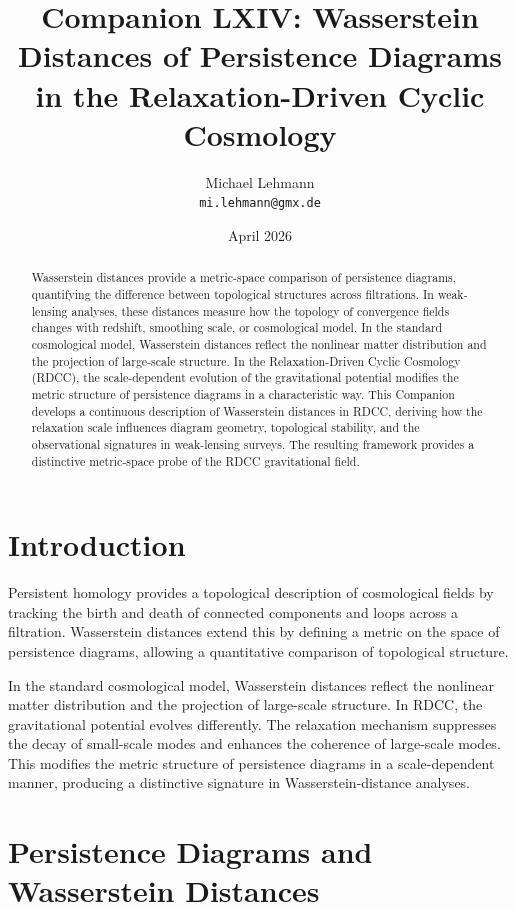 \documentclass[11pt,a4paper]{article}
\title{\textbf{Companion LXIV: Wasserstein Distances of Persistence Diagrams in the Relaxation-Driven Cyclic Cosmology}}
\author{Michael Lehmann \\ \texttt{mi.lehmann@gmx.de}}
\date{April 2026}
\begin{document}
\maketitle

\begin{abstract}
Wasserstein distances provide a metric-space comparison of persistence diagrams, 
quantifying the difference between topological structures across filtrations. In 
weak-lensing analyses, these distances measure how the topology of convergence 
fields changes with redshift, smoothing scale, or cosmological model. In the 
standard cosmological model, Wasserstein distances reflect the nonlinear matter 
distribution and the projection of large-scale structure. In the Relaxation-Driven 
Cyclic Cosmology (RDCC), the scale-dependent evolution of the gravitational 
potential modifies the metric structure of persistence diagrams in a 
characteristic way. This Companion develops a continuous description of 
Wasserstein distances in RDCC, deriving how the relaxation scale influences 
diagram geometry, topological stability, and the observational signatures in 
weak-lensing surveys. The resulting framework provides a distinctive metric-space 
probe of the RDCC gravitational field.
\end{abstract}
\section{Introduction}

Persistent homology provides a topological description of cosmological fields by 
tracking the birth and death of connected components and loops across a 
filtration. Wasserstein distances extend this by defining a metric on the space of 
persistence diagrams, allowing a quantitative comparison of topological structure.

In the standard cosmological model, Wasserstein distances reflect the nonlinear 
matter distribution and the projection of large-scale structure. In RDCC, the 
gravitational potential evolves differently. The relaxation mechanism suppresses 
the decay of small-scale modes and enhances the coherence of large-scale modes. 
This modifies the metric structure of persistence diagrams in a scale-dependent 
manner, producing a distinctive signature in Wasserstein-distance analyses.
\section{Persistence Diagrams and Wasserstein Distances}
\end{document}
